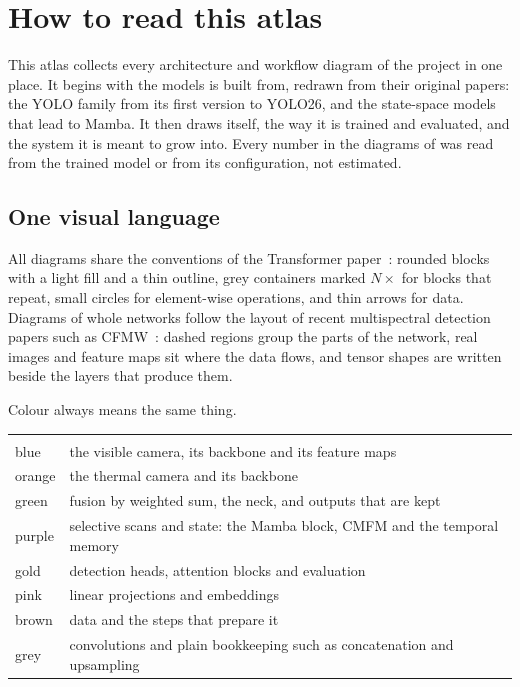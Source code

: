 \chapter{How to read this atlas}

This atlas collects every architecture and workflow diagram of the project in one place. It begins with the models
\method{} is built from, redrawn from their original papers: the YOLO family from its first version to YOLO26, and the
state-space models that lead to Mamba. It then draws \method{} itself, the way it is trained and evaluated, and the
system it is meant to grow into. Every number in the diagrams of \method{} was read from the trained model or from
its configuration, not estimated.

\section{One visual language}

All diagrams share the conventions of the Transformer paper~\cite{vaswani2017attention}: rounded blocks with a
light fill and a thin outline, grey containers marked $N\times$ for blocks that repeat, small circles for
element-wise operations, and thin arrows for data. Diagrams of whole networks follow the layout of recent
multispectral detection papers such as CFMW~\cite{li2025cfmw}: dashed regions group the parts of the network,
real images and feature maps sit where the data flows, and tensor shapes are written beside the layers that
produce them.

Colour always means the same thing.

\begin{tabularx}{\textwidth}{@{}P{3.4cm}L@{}}
 &  \\
blue & the visible camera, its backbone and its feature maps \\
orange & the thermal camera and its backbone \\
green & fusion by weighted sum, the neck, and outputs that are kept \\
purple & selective scans and state: the Mamba block, CMFM and the temporal memory \\
gold & detection heads, attention blocks and evaluation \\
pink & linear projections and embeddings \\
brown & data and the steps that prepare it \\
grey & convolutions and plain bookkeeping such as concatenation and upsampling \\
\end{tabularx}

